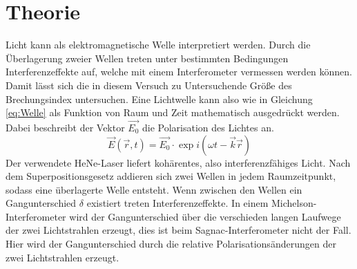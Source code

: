 \section{Theorie}
\label{sec:Theorie}
Licht kann als elektromagnetische Welle interpretiert werden. Durch die Überlagerung
zweier Wellen treten unter bestimmten Bedingungen Interferenzeffekte auf, welche mit
einem Interferometer vermessen werden können. Damit lässt sich die in diesem Versuch
zu Untersuchende Größe des Brechungsindex untersuchen.
Eine Lichtwelle kann also wie in Gleichung \ref{eq:Welle} als Funktion von Raum und Zeit
mathematisch ausgedrückt werden. Dabei beschreibt der Vektor $\vec{E_0}$ die Polarisation des Lichtes an.
\begin{equation}
	\vec{E}(\vec{r},t) = \vec{E_0}\cdot \exp i(\omega t - \vec{k}\vec{r})
\label{eq:Welle}
\end{equation}
Der verwendete HeNe-Laser liefert kohärentes, also interferenzfähiges Licht.
Nach dem Superpositionsgesetz addieren sich zwei Wellen in jedem Raumzeitpunkt,
sodass eine überlagerte Welle entsteht. Wenn zwischen den Wellen ein Gangunterschied
$\delta$ existiert treten Interferenzeffekte. In einem Michelson-Interferometer wird der
Gangunterschied über die verschieden langen Laufwege der zwei Lichtstrahlen erzeugt, dies ist
beim Sagnac-Interferometer nicht der Fall. Hier wird der Gangunterschied durch die relative
Polarisationsänderungen der zwei Lichtstrahlen erzeugt.

